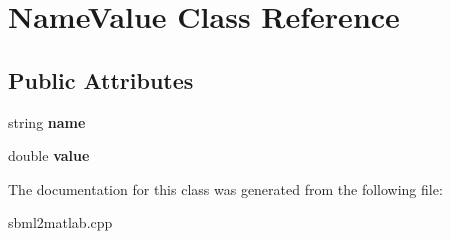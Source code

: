 \hypertarget{class_name_value}{\section{Name\-Value Class Reference}
\label{class_name_value}
}
\subsection*{Public Attributes}
\begin{DoxyCompactItemize}
\item 
\hypertarget{class_name_value_ad8335dd455dd4b1ab52f537ae775f92b}{string {\bfseries name}}\label{class_name_value_ad8335dd455dd4b1ab52f537ae775f92b}

\item 
\hypertarget{class_name_value_abf784a3b9a61e8c90a0c7fa7a9ac41e4}{double {\bfseries value}}\label{class_name_value_abf784a3b9a61e8c90a0c7fa7a9ac41e4}

\end{DoxyCompactItemize}


The documentation for this class was generated from the following file\-:\begin{DoxyCompactItemize}
\item 
sbml2matlab.\-cpp\end{DoxyCompactItemize}
